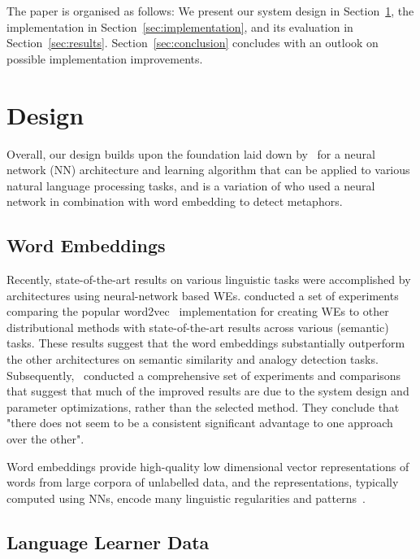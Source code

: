 \documentclass[11pt,a4paper]{article}
\begin{document}
The paper is organised as follows: We present our system design in
Section~\ref{sec:design}, the implementation in
Section~\ref{sec:implementation}, and its evaluation in
Section~\ref{sec:results}. 
Section~\ref{sec:conclusion} concludes with an outlook on possible
implementation improvements.

\section{Design} %
\label{sec:design}

Overall, our design builds upon the foundation
laid down by~ for a neural network (NN) architecture
and learning algorithm that can be applied to various natural language
processing tasks, and is a variation of \cite{W16-1104} who used a neural network in combination with word embedding to detect metaphors.

\subsection{Word Embeddings} %

Recently, state-of-the-art results on various linguistic tasks were
accomplished by architectures using neural-network based WEs.
 conducted a set of
experiments comparing the popular
word2vec~\cite{DBLP:journals/corr/abs-1301-3781,arXiv:1310.4546}
implementation for creating WEs to other distributional methods with
state-of-the-art results across various (semantic) tasks. 
These results suggest that the word embeddings substantially
outperform the other architectures on semantic similarity and analogy
detection tasks.
Subsequently,~ conducted a comprehensive set of
experiments and comparisons that suggest that much of the improved results are
due to the system design and parameter optimizations, rather than the selected
method.  
They conclude that "there does not seem to be a consistent significant
advantage to one approach over the other".

Word embeddings provide high-quality low dimensional vector representations of
words from large corpora of unlabelled data, and the representations, typically
computed using NNs, encode many linguistic regularities and
patterns~\cite{arXiv:1310.4546}.


\subsection{Language Learner Data}
\end{document}
